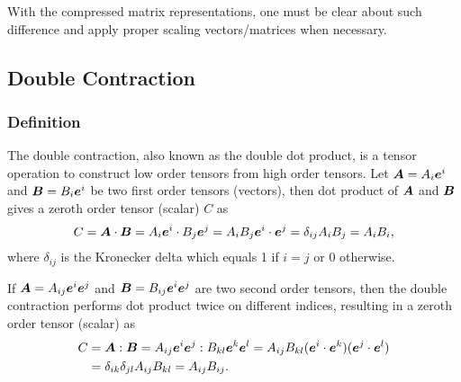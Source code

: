 With the compressed matrix representations, one must be clear about such difference and apply proper scaling vectors/matrices when necessary.
\subsection{Double Contraction}
\subsubsection{Definition}
The double contraction, also known as the double dot product, is a tensor operation to construct low order tensors from high order tensors. Let $\bm{A}=A_i\bm{e}^i$ and $\bm{B}=B_i\bm{e}^i$ be two first order tensors (vectors), then dot product of $\bm{A}$ and $\bm{B}$ gives a zeroth order tensor (scalar) $C$ as
\begin{gather}
C=\bm{A}\cdot\bm{B}=A_i\bm{e}^i\cdot{}B_j\bm{e}^j=A_iB_j\bm{e}^i\cdot\bm{e}^j=\delta_{ij}A_iB_j=A_iB_i,
\end{gather}
where $\delta_{ij}$ is the Kronecker delta which equals \num{1} if $i=j$ or \num{0} otherwise.

If $\bm{A}=A_{ij}\bm{e}^i\bm{e}^j$ and $\bm{B}=B_{ij}\bm{e}^i\bm{e}^j$ are two second order tensors, then the double contraction performs dot product twice on different indices, resulting in a zeroth order tensor (scalar) as
\begin{gather}\label{eq:double_contraction}
\begin{split}
C&=\bm{A}:\bm{B}=A_{ij}\bm{e}^i\bm{e}^j:B_{kl}\bm{e}^k\bm{e}^l=A_{ij}B_{kl}(\bm{e}^i\cdot\bm{e}^k)(\bm{e}^j\cdot\bm{e}^l)\\&=\delta_{ik}\delta_{jl}A_{ij}B_{kl}=A_{ij}B_{ij}.
\end{split}
\end{gather}
